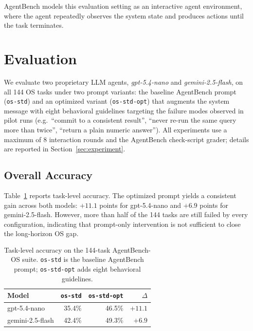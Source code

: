 \documentclass[11pt]{article}
\begin{document}
AgentBench models this evaluation setting as an interactive agent environment, where the agent repeatedly observes the system state and produces actions until the task terminates.



\section{Evaluation}

We evaluate two proprietary LLM agents, \textit{gpt-5.4-nano} and \textit{gemini-2.5-flash}, on all 144 OS tasks under two prompt variants: the baseline AgentBench prompt (\texttt{os-std}) and an optimized variant (\texttt{os-std-opt}) that augments the system message with eight behavioral guidelines targeting the failure modes observed in pilot runs (e.g.\ ``commit to a consistent result'', ``never re-run the same query more than twice'', ``return a plain numeric answer''). All experiments use a maximum of 8 interaction rounds and the AgentBench check-script grader; details are reported in Section~\ref{sec:experiment}.

\subsection{Overall Accuracy}

Table~\ref{tab:accuracy} reports task-level accuracy. The optimized prompt yields a consistent gain across both models: $+11.1$ points for gpt-5.4-nano and $+6.9$ points for gemini-2.5-flash. However, more than half of the 144 tasks are still failed by every configuration, indicating that prompt-only intervention is not sufficient to close the long-horizon OS gap.

\begin{table}[t]
\centering
\small
\begin{tabular}{lrrr}
\toprule
Model & \texttt{os-std} & \texttt{os-std-opt} & $\Delta$ \\
\midrule
gpt-5.4-nano       & 35.4\% & 46.5\% & $+11.1$ \\
gemini-2.5-flash   & 42.4\% & 49.3\% & $+6.9$  \\
\bottomrule
\end{tabular}
\caption{Task-level accuracy on the 144-task AgentBench-OS suite. \texttt{os-std} is the baseline AgentBench prompt; \texttt{os-std-opt} adds eight behavioral guidelines.}
\label{tab:accuracy}
\end{table}
\end{document}
